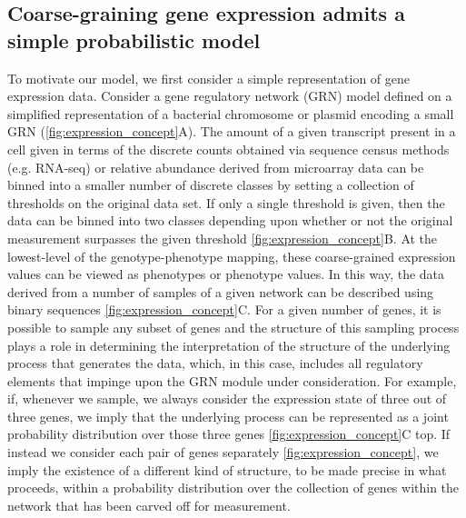 \subsection{Coarse-graining gene expression admits a simple probabilistic model}
To motivate our model, we first consider a simple representation of gene expression data. Consider a gene regulatory network (GRN) model defined on a simplified representation of a bacterial chromosome or plasmid encoding a small GRN (\ref{fig:expression_concept}A). The amount of a given transcript present in a cell given in terms of the discrete counts obtained via sequence census methods (e.g. RNA-seq) or relative abundance derived from microarray data can be binned into a smaller number of discrete classes by setting a collection of thresholds on the original data set. If only a single threshold is given, then the data can be binned into two classes depending upon whether or not the original measurement surpasses the given threshold \ref{fig:expression_concept}B. At the lowest-level of the genotype-phenotype mapping, these coarse-grained expression values can be viewed as phenotypes or phenotype values. In this way, the data derived from a number of samples of a given network can be described using binary sequences \ref{fig:expression_concept}C. For a given number of genes, it is possible to sample any subset of genes and the structure of this sampling process plays a role in determining the interpretation of the structure of the underlying process that generates the data, which, in this case, includes all regulatory elements that impinge upon the GRN module under consideration. For example, if, whenever we sample, we always consider the expression state of three out of three genes, we imply that the underlying process can be represented as a joint probability distribution over those three genes \ref{fig:expression_concept}C top. If instead we consider each pair of genes separately \ref{fig:expression_concept}, we imply the existence of a different kind of structure, to be made precise in what proceeds, within a probability distribution over the collection of genes within the network that has been carved off for measurement.

